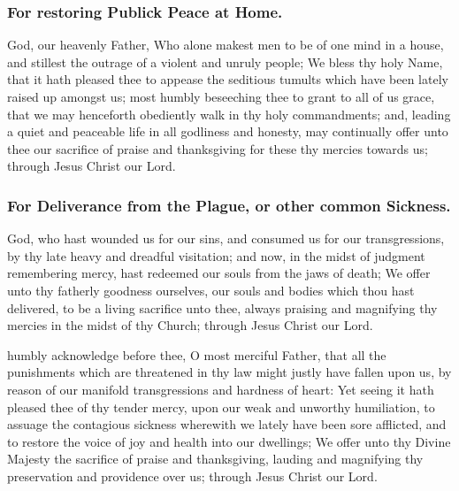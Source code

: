 \subsubsection{For restoring Publick Peace at Home.}
 God, our heavenly Father, Who alone makest men to be of one mind in a house, and stillest the outrage of a violent and unruly people; We bless thy holy Name, that it hath pleased thee to appease the seditious tumults which have been lately raised up amongst us; most humbly beseeching thee to grant to all of us grace, that we may henceforth obediently walk in thy holy commandments; and, leading a quiet and peaceable life in all godliness and honesty, may continually offer unto thee our sacrifice of praise and thanksgiving for these thy mercies towards us; through Jesus Christ our Lord.

\subsubsection{For Deliverance from the Plague, or other common Sickness.}
 God, who hast wounded us for our sins, and consumed us for our transgressions, by thy late heavy and dreadful visitation; and now, in the midst of judgment remembering mercy, hast redeemed our souls from the jaws of death; We offer unto thy fatherly goodness ourselves, our souls and bodies which thou hast delivered, to be a living sacrifice unto thee, always praising and magnifying thy mercies in the midst of thy Church; through Jesus Christ our Lord.

 humbly acknowledge before thee, O most merciful Father, that all the punishments which are threatened in thy law might justly have fallen upon us, by reason of our manifold transgressions and hardness of heart: Yet seeing it hath pleased thee of thy tender mercy, upon our weak and unworthy humiliation, to assuage the contagious sickness wherewith we lately have been sore afflicted, and to restore the voice of joy and health into our dwellings; We offer unto thy Divine Majesty the sacrifice of praise and thanksgiving, lauding and magnifying thy preservation and providence over us; through Jesus Christ our Lord.

\clearpage
